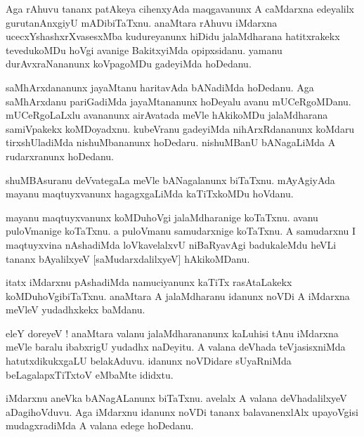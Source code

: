 \documentclass{article}
\begin{document}
\begin{mn}%
Aga rAhuvu tananx patAkeya cihenxyAda maqgavanunx A caMdarxna edeyalilx gurutanAnxgiyU 
mADibiTaTxnu. anaMtara rAhuvu iMdarxna ucecxYshashxrXvasesxMba kudureyanunx hiDidu 
jalaMdharana hatitxrakekx tevedukoMDu hoVgi avanige BakitxyiMda opipxsidanu. yamanu 
durAvxraNananunx koVpagoMDu gadeyiMda hoDedanu.
\end{mn}

\begin{mn}%
saMhArxdananunx jayaMtanu haritavAda bANadiMda hoDedanu. Aga saMhArxdanu pariGadiMda 
jayaMtananunx hoDeyalu avanu mUCeRgoMDanu. mUCeRgoLaLxlu avananunx airAvatada meVle 
hAkikoMDu jalaMdharana samiVpakekx koMDoyadxnu. kubeVranu gadeyiMda nihArxRdananunx koMdaru 
tirxshUladiMda nishuMbananunx hoDedaru. nishuMBanU bANagaLiMda A rudarxranunx hoDedanu.
\end{mn}

\begin{mn}%
shuMBAsuranu deVvategaLa meVle bANagalanunx biTaTxnu. mAyAgiyAda mayanu maqtuyxvanunx 
hagagxgaLiMda kaTiTxkoMDu hoVdanu.
\end{mn}

\begin{mn}%
mayanu maqtuyxvanunx koMDuhoVgi jalaMdharanige koTaTxnu. avanu puloVmanige koTaTxnu. a 
puloVmanu samudarxnige koTaTxnu. A samudarxnu I maqtuyxvina nAshadiMda loVkavelalxvU 
niBaRyavAgi badukaleMdu heVLi tananx bAyalilxyeV [saMudarxdalilxyeV] hAkikoMDanu.
\end{mn}

\begin{mn}%
itatx iMdarxnu pAshadiMda namuciyanunx kaTiTx rasAtaLakekx koMDuhoVgibiTaTxnu. anaMtara A 
jalaMdharanu idanunx noVDi A iMdarxna meVleV yudadhxkekx baMdanu.
\end{mn}

\begin{mn}%
eleY doreyeV ! anaMtara valanu jalaMdharananunx kaLuhisi tAnu iMdarxna meVle baralu 
ibabxrigU yudadhx naDeyitu. A valana deVhada teVjasisxniMda hatutxdikukxgaLU belakAduvu. 
idanunx noVDidare sUyaRniMda beLagalapxTiTxtoV eMbaMte ididxtu.
\end{mn}

\begin{mn}%
iMdarxnu aneVka bANagALanunx biTaTxnu. avelalx A valana deVhadalilxyeV aDagihoVduvu. Aga 
iMdarxnu idanunx noVDi tananx balavanenxlAlx upayoVgisi mudagxradiMda A valana edege 
hoDedanu.
\end{mn}
\end{document}
